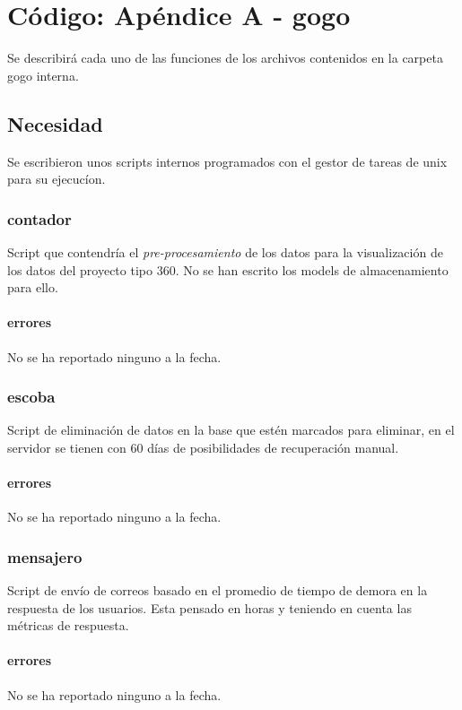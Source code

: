 \documentclass[10pt,a4paper]{book}
\begin{document}
	
	
	\chapter{Código: Apéndice A - gogo}
	
	Se describirá cada uno de las funciones de los archivos contenidos en la carpeta gogo interna.
	
	\section{Necesidad}
	
	Se escribieron unos scripts internos programados con el gestor de tareas de unix para su ejecucíon.
	
	\subsection{contador}
	Script que contendría el \textit{pre-procesamiento} de los datos para la visualización de los datos del proyecto tipo 360. No se han escrito los models de almacenamiento para ello.
	\subsubsection{errores}
	No se ha reportado ninguno a la fecha.
	
	\subsection{escoba}
	Script de eliminación de datos en la base que estén marcados para eliminar, en el servidor se tienen con 60 días de posibilidades de recuperación manual.
	\subsubsection{errores}
	No se ha reportado ninguno a la fecha.
	
	\subsection{mensajero}
	Script de envío de correos basado en el promedio de tiempo de demora en la respuesta de los usuarios. Esta pensado en horas y teniendo en cuenta las métricas de respuesta.  
	\subsubsection{errores}
	No se ha reportado ninguno a la fecha.
	
	
\end{document}
